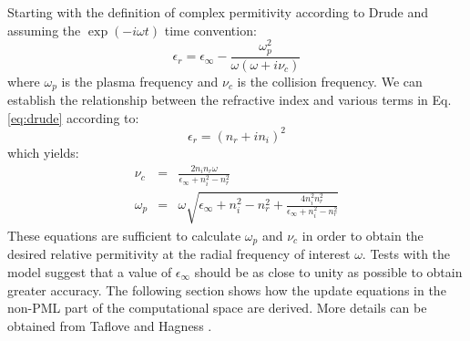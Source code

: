 \documentclass[a4paper, 12pt]{article}
\begin{document}
	Starting with the definition of complex permitivity according to
	Drude and assuming the $\exp(-i\omega t)$ time convention:
	\begin{equation}
		\epsilon_r=\epsilon_\infty - \frac{\omega_p^2}{\omega\left(\omega+i\nu_c\right)}\label{eq:drude}
	\end{equation}
	where $\omega_p$ is the plasma frequency and $\nu_c$ is the collision
	frequency. We can establish the relationship between the refractive
	index and various terms in Eq. \ref{eq:drude} according to:
	\begin{equation}
		\epsilon_r=(n_r+in_i)^2
	\end{equation}
	which yields:
	\begin{eqnarray}
		\nu_c&=&\frac{2n_in_r\omega}{\epsilon_\infty+n_i^2-n_r^2}\\
		\omega_p&=&\omega\sqrt{\epsilon_\infty+n_i^2-n_r^2+\frac{4n_i^2n_r^2}{\epsilon_\infty
				+ n_i^2 - n_r^2}}
	\end{eqnarray}
	These equations are sufficient to calculate $\omega_p$ and $\nu_c$ in
	order to obtain the desired relative permitivity at the radial frequency of
	interest $\omega$. Tests with the model suggest that a value of
	$\epsilon_\infty$ should be as close to unity as possible to obtain
	greater accuracy. The following section shows how the update equations
	in the non-PML part of the computational space are derived. More
	details can be obtained from Taflove and Hagness \cite{taflove00book}.
\end{document}
